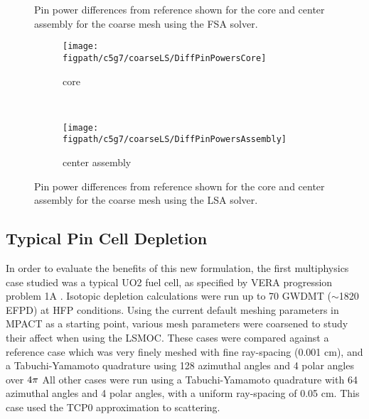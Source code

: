 {{{\begin{figure}[htbp]
\begin{subfigure}[t]{0.49\textwidth}
        \end{subfigure}
        \caption{Pin power differences from reference shown for the core and center assembly for the coarse mesh using the FSA solver.\label{figs:LSMOC:C5G7:CoarseFS:PinPowers}}
      \end{figure}
      \begin{figure}[htbp]
        \centering
        \begin{subfigure}[t]{0.49\textwidth}
          \centering
          \texttt{[image: \\figpath/c5g7/coarseLS/DiffPinPowersCore]}
          \caption{core\label{fig:LSMOC:C5G7:CoarseLS:PinPowers:Core}}
        \end{subfigure}%
        ~
        \begin{subfigure}[t]{0.49\textwidth}
          \centering
            \texttt{[image: \\figpath/c5g7/coarseLS/DiffPinPowersAssembly]}
            \caption{center assembly\label{fig:LSMOC:C5G7:CoarseLS:PinPowers:Assembly}}
        \end{subfigure}
        \caption{Pin power differences from reference shown for the core and center assembly for the coarse mesh using the LSA solver.\label{figs:LSMOC:C5G7:CoarseLS:PinPowers}}
      \end{figure}
    }

    \subsection{Typical Pin Cell Depletion}{\label{ssec:LSMOC:Typical Pin Cell Depletion}
      In order to evaluate the benefits of this new formulation, the first multiphysics case studied was a typical \ac{UO2} fuel cell, as specified by \ac{VERA} progression problem 1A \cite{VERAProblems}.
      Isotopic depletion calculations were run up to 70 \ac{GWDMT} ($\sim$1820 \ac{EFPD}) at \ac{HFP} conditions.
      Using the current default meshing parameters in MPACT as a starting point, various mesh parameters were coarsened to study their affect when using the \ac{LSMOC}.
      These cases were compared against a reference case which was very finely meshed with fine ray-spacing (0.001 cm), and a Tabuchi-Yamamoto \cite{Yamamoto2005} quadrature using 128 azimuthal angles and 4 polar angles over $4\pi$
      All other cases were run using a Tabuchi-Yamamoto quadrature with 64 azimuthal angles and 4 polar angles, with a uniform ray-spacing of 0.05 cm.
      This case used the \ac{TCP0} approximation to scattering.

}}}

